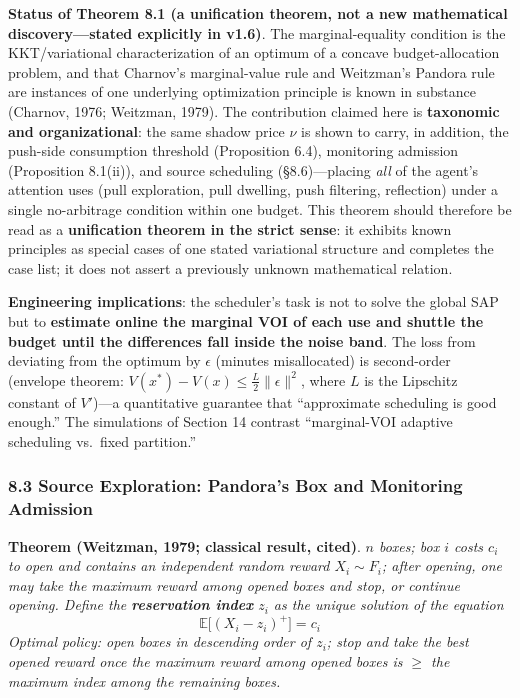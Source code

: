 \documentclass[
  11pt]{article}
\begin{document}
\textbf{Status of Theorem 8.1 (a unification theorem, not a new
mathematical discovery---stated explicitly in v1.6)}. The
marginal-equality condition is the KKT/variational characterization of
an optimum of a concave budget-allocation problem, and that Charnov's
marginal-value rule and Weitzman's Pandora rule are instances of one
underlying optimization principle is known in substance (Charnov, 1976;
Weitzman, 1979). The contribution claimed here is \textbf{taxonomic and
organizational}: the same shadow price \(\nu\) is shown to carry, in
addition, the push-side consumption threshold (Proposition 6.4),
monitoring admission (Proposition 8.1(ii)), and source scheduling
(§8.6)---placing \emph{all} of the agent's attention uses (pull
exploration, pull dwelling, push filtering, reflection) under a single
no-arbitrage condition within one budget. This theorem should therefore
be read as a \textbf{unification theorem in the strict sense}: it
exhibits known principles as special cases of one stated variational
structure and completes the case list; it does not assert a previously
unknown mathematical relation.

\textbf{Engineering implications}: the scheduler's task is not to solve
the global SAP but to \textbf{estimate online the marginal VOI of each
use and shuttle the budget until the differences fall inside the noise
band}. The loss from deviating from the optimum by \(\epsilon\) (minutes
misallocated) is second-order (envelope theorem:
\(V(x^*) - V(x) \le \frac{L}{2}\|\epsilon\|^2\), where \(L\) is the
Lipschitz constant of \(V'\))---a quantitative guarantee that
``approximate scheduling is good enough.'' The simulations of Section 14
contrast ``marginal-VOI adaptive scheduling vs.~fixed partition.''

\subsubsection{8.3 Source Exploration: Pandora's Box and Monitoring
Admission}\label{source-exploration-pandoras-box-and-monitoring-admission}

\textbf{Theorem (Weitzman, 1979; classical result, cited)}. \emph{\(n\)
boxes; box \(i\) costs \(c_i\) to open and contains an independent
random reward \(X_i \sim F_i\); after opening, one may take the maximum
reward among opened boxes and stop, or continue opening. Define the
\textbf{reservation index} \(z_i\) as the unique solution of the
equation} \[\mathbb{E}\big[(X_i - z_i)^+\big] = c_i\] \emph{Optimal
policy: open boxes in descending order of \(z_i\); stop and take the
best opened reward once the maximum reward among opened boxes is \(\ge\)
the maximum index among the remaining boxes.}
\end{document}
